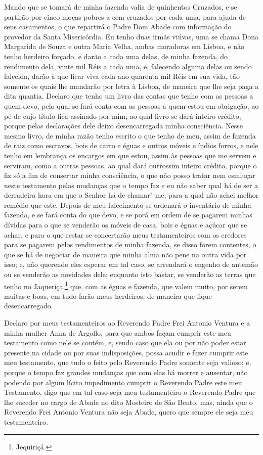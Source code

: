 Mando que se tomará de minha fazenda valia de quinhentos Cruzados, e se
partirão por cinco moças pobres a cem cruzados por cada uma, para ajuda
de seus casamentos, o que repartirá o Padre Dom Abade com informação do
provedor da Santa Misericórdia. Eu tenho duas irmãs viúvas, uma se
chama Dona Margarida de Souza e outra Maria Velha, ambas moradoras em 
Lisboa, e não tenho herdeiro forçado, e darão a cada uma delas, de
minha fazenda, do rendimento dela, vinte mil Réis a cada uma, e,
falecendo alguma delas ou sendo falecida, darão à que ficar viva cada
ano quarenta mil Réis em sua vida, tão somente os quais lhe mandarão
por letra à Lisboa, de maneira que lhe seja paga a dita quantia.
Declaro que tenho um livro das contas que tenho com as pessoas a quem
devo, pelo qual se fará conta com as pessoas a quem estou em obrigação,
ao pé de cujo título fica assinado por mim, ao qual livro se dará
inteiro crédito, porque pelas declarações dele deixo desencarregada
minha consciência. Nesse mesmo livro, de minha razão tenho escrito o
que tenho de meu, assim de fazenda de raiz como escravos, bois de carro
e éguas e outros móveis e índios forros, e nele tenho em lembrança os
encargos em que estou, assim às pessoas que me servem e serviram, como
a outras pessoas, ao qual dará outrossim inteiro crédito, porque o fiz
só a fim de consertar minha consciência, o que não posso tratar nem
esmiuçar neste testamento pelas mudanças que o tempo faz e eu não saber
qual há de ser a derradeira hora em que o Senhor há de chamar"-me, para
a qual não achei melhor remédio que este. Depois de meu falecimento se
ordenará o inventário de minha fazenda, e se fará conta do que devo, e
se porá em ordem de se pagarem minhas dívidas para o que se venderão os
móveis de casa, bois e éguas e açúcar que se achar, e para o que restar
se concertarão meus testamenteiros com os credores para se pagarem
pelos rendimentos de minha fazenda, se disso forem contentes, o que se
há de negociar de maneira que minha alma não pene na outra vida por
isso; e, não querendo eles esperar em tal caso, se arrendará o engenho
de antemão ou se venderão as novidades dele; enquanto isto bastar, se
venderão as terras que tenho no Jaqueriça,\footnote{ Jequiriçá.} que,
com as éguas e fazenda, que valem muito, por serem muitas e boas, em
tudo farão meus herdeiros, de maneira que fique desencarregado.

Declaro por meus testamenteiros ao Reverendo Padre Frei Antonio Ventura
e a minha mulher Anna de Argollo, para que ambos façam cumprir este meu
testamento como nele se contém, e, sendo caso que ela ou por não poder
estar presente na cidade ou por suas indisposições, possa acudir e
fazer cumprir este meu testamento, que tudo o feito pelo Reverendo
Padre somente seja valioso; e, porque o tempo faz grandes mudanças que
com elas há morrer e ausentar, não podendo por algum lícito impedimento
cumprir o Reverendo Padre este meu Testamento, digo que em tal caso
seja meu testamenteiro o Reverendo Padre que lhe suceder no cargo de
Abade no dito Mosteiro de São Bento, mas, ainda que o Reverendo Frei
Antonio Ventura não seja Abade, quero que sempre ele seja meu
testamenteiro.

